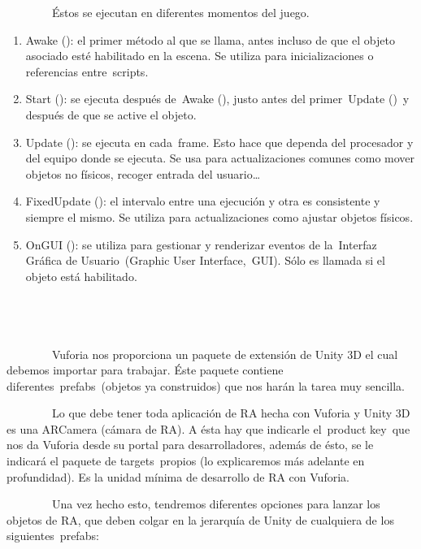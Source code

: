 \documentclass[]{article}
\begin{document}
~~~~~~~~Éstos se ejecutan en diferentes momentos del juego.

\begin{enumerate}
\itemsep1pt\parskip0pt
\item
  Awake (): el primer método al que se llama, antes incluso de que el
  objeto asociado esté habilitado en la escena. Se utiliza para
  inicializaciones o referencias entre~scripts.
\item
  Start (): se ejecuta después de~Awake (), justo antes del
  primer~Update ()~y después de que se active el objeto.
\item
  Update (): se ejecuta en cada~frame. Esto hace que dependa del
  procesador y del equipo donde se ejecuta. Se usa para actualizaciones
  comunes como mover objetos no físicos, recoger entrada del
  usuario\ldots{}
\item
  FixedUpdate (): el intervalo entre una ejecución y otra es consistente
  y siempre el mismo. Se utiliza para actualizaciones como ajustar
  objetos físicos.
\item
  OnGUI (): se utiliza para gestionar y renderizar eventos de
  la~Interfaz Gráfica de Usuario~(Graphic User Interface,~GUI). Sólo es
  llamada si el objeto está habilitado.
\end{enumerate}

\subsection{~~~~~~~~}


~~~~~~~~Vuforia nos proporciona un paquete de extensión de Unity 3D el
cual debemos importar para trabajar. Éste paquete contiene
diferentes~prefabs~(objetos ya construidos) que nos harán la tarea muy
sencilla.

~~~~~~~~Lo que debe tener toda aplicación de RA hecha con Vuforia y
Unity 3D es una ARCamera (cámara de RA). A ésta hay que indicarle
el~product key~que nos da Vuforia desde su portal para desarrolladores,
además de ésto, se le indicará el paquete de targets~propios (lo
explicaremos más adelante en profundidad). Es la unidad mínima de
desarrollo de RA con Vuforia.

~~~~~~~~Una vez hecho esto, tendremos diferentes opciones para lanzar
los objetos de RA, que deben colgar en la jerarquía de Unity de
cualquiera de los siguientes~prefabs:
\end{document}

